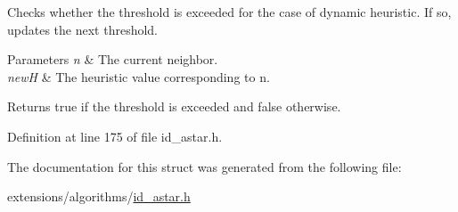 Checks whether the threshold is exceeded for the case of dynamic heuristic. If so, updates the next threshold. 


\begin{DoxyParams}{Parameters}
{\em n} & The current neighbor. \\
\hline
{\em newH} & The heuristic value corresponding to {\ttfamily n}. \\
\hline
\end{DoxyParams}
\begin{DoxyReturn}{Returns}
{\ttfamily true} if the threshold is exceeded and {\ttfamily false} otherwise. 
\end{DoxyReturn}


Definition at line 175 of file id\+\_\+astar.\+h.



The documentation for this struct was generated from the following file\+:\begin{DoxyCompactItemize}
\item 
extensions/algorithms/\hyperlink{id__astar_8h}{id\+\_\+astar.\+h}\end{DoxyCompactItemize}
